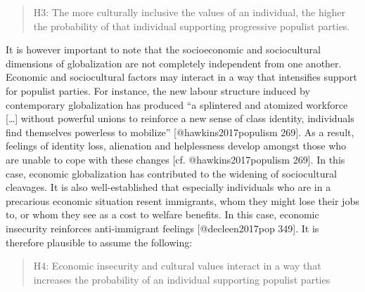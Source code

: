 \documentclass[]{article}
\begin{document}
\begin{quote}
H3: The more culturally inclusive the values of an individual, the
higher the probability of that individual supporting progressive
populist parties.
\end{quote}

It is however important to note that the socioeconomic and sociocultural
dimensions of globalization are not completely independent from one
another. Economic and sociocultural factors may interact in a way that
intensifies support for populist parties. For instance, the new labour
structure induced by contemporary globalization has produced ``a
splintered and atomized workforce {[}\ldots{}{]} without powerful unions
to reinforce a new sense of class identity, individuals find themselves
powerless to mobilize'' {[}@hawkins2017populism 269{]}. As a result,
feelings of identity loss, alienation and helplessness develop amongst
those who are unable to cope with these changes {[}cf.
@hawkins2017populism 269{]}. In this case, economic globalization has
contributed to the widening of sociocultural cleavages. It is also
well-established that especially individuals who are in a precarious
economic situation resent immigrants, whom they might lose their jobs
to, or whom they see as a cost to welfare benefits. In this case,
economic insecurity reinforces anti-immigrant feelings
{[}@decleen2017pop 349{]}. It is therefore plausible to assume the
following:

\begin{quote}
H4: Economic insecurity and cultural values interact in a way that
increases the probability of an individual supporting populist parties
\end{quote}
\end{document}
